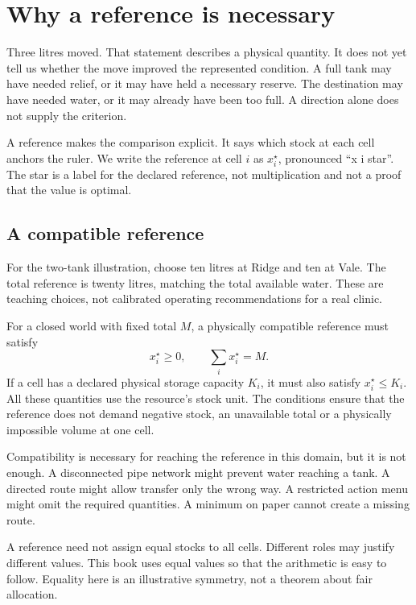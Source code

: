\chapter{Why a reference is necessary}\label{ch:reference}

Three litres moved. That statement describes a physical quantity. It does not yet tell us whether the move improved the represented condition. A full tank may have needed relief, or it may have held a necessary reserve. The destination may have needed water, or it may already have been too full. A direction alone does not supply the criterion.

A reference makes the comparison explicit. It says which stock at each cell anchors the ruler. We write the reference at cell $i$ as $x_i^\star$, pronounced ``x i star''. The star is a label for the declared reference, not multiplication and not a proof that the value is optimal.

\section{A compatible reference}
For the two-tank illustration, choose ten litres at Ridge and ten at Vale. The total reference is twenty litres, matching the total available water. These are teaching choices, not calibrated operating recommendations for a real clinic.

For a closed world with fixed total $M$, a physically compatible reference must satisfy
\begin{equation}\label{eq:compatibility}
 x_i^\star\geq0,\qquad \sum_i x_i^\star=M.
\end{equation}
If a cell has a declared physical storage capacity $K_i$, it must also satisfy $x_i^\star\leq K_i$. All these quantities use the resource's stock unit. The conditions ensure that the reference does not demand negative stock, an unavailable total or a physically impossible volume at one cell.

Compatibility is necessary for reaching the reference in this domain, but it is not enough. A disconnected pipe network might prevent water reaching a tank. A directed route might allow transfer only the wrong way. A restricted action menu might omit the required quantities. A minimum on paper cannot create a missing route.

A reference need not assign equal stocks to all cells. Different roles may justify different values. This book uses equal values so that the arithmetic is easy to follow. Equality here is an illustrative symmetry, not a theorem about fair allocation.


